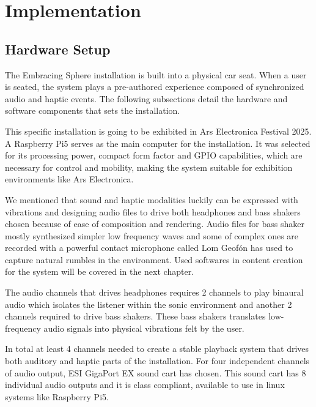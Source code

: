 \chapter{Implementation}
    \section{Hardware Setup}
        The Embracing Sphere installation is built into a physical car seat. When a user is seated, the system plays a pre-authored experience composed of synchronized audio and haptic events. The following subsections detail the hardware and software components that sets the installation.\par

        This specific installation is going to be exhibited in Ars Electronica Festival 2025. A Raspberry Pi5 serves as the main computer for the installation. It was selected for its processing power, compact form factor and GPIO capabilities, which are necessary for control and mobility, making the system suitable for exhibition environments like Ars Electronica.\par

        We mentioned that sound and haptic modalities luckily can be expressed with vibrations and  designing audio files to drive both headphones and bass shakers chosen because of ease of composition and rendering. Audio files for bass shaker mostly synthesized simpler low frequency waves and some of complex ones are recorded with a powerful contact microphone called Lom Geofón has used to capture natural rumbles in the environment. Used softwares in content creation for the system will be covered in the next chapter.\par

        The audio channels that drives headphones requires 2 channels to play binaural audio which isolates the listener within the sonic environment and another 2 channels required to drive bass shakers. These bass shakers translates low-frequency audio signals into physical vibrations felt by the user.\par

        In total at least 4 channels needed to create a stable playback system that drives both auditory and haptic parts of the installation. For four independent channels of audio output, ESI GigaPort EX sound cart has chosen. This sound cart has 8 individual audio outputs and it is class compliant, available to use in linux systems like Raspberry Pi5.\par

